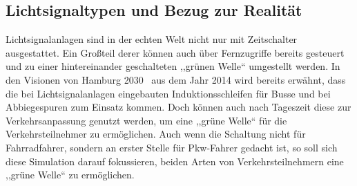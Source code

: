 %

\subsection{Lichtsignaltypen und Bezug zur Realität}\label{subsec:types-and-reality}

Lichtsignalanlagen sind in der echten Welt nicht nur mit Zeitschalter ausgestattet.
Ein Großteil derer können auch über Fernzugriffe bereits gesteuert und zu einer hintereinander geschalteten ,,grünen Welle`` umgestellt werden.
In den Visionen von Hamburg 2030~\cite[S. 42]{HHH2014} aus dem Jahr 2014 wird bereits erwähnt, dass die bei Lichtsignalanlagen eingebauten Induktionsschleifen für Busse und bei Abbiegespuren zum Einsatz kommen.
Doch können auch nach Tageszeit diese zur Verkehrsanpassung genutzt werden, um eine ,,grüne Welle`` für die Verkehrsteilnehmer zu ermöglichen.
Auch wenn die Schaltung nicht für Fahrradfahrer, sondern an erster Stelle für Pkw-Fahrer gedacht ist, so soll sich diese Simulation darauf fokussieren, beiden Arten von Verkehrsteilnehmern eine ,,grüne Welle`` zu ermöglichen.
